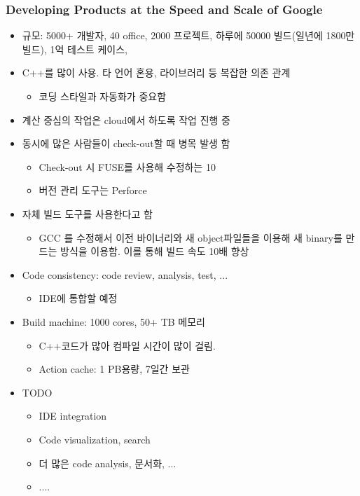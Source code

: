 \begin{frame}
\frametitle{Developing Products at the Speed and Scale of Google}

\begin{itemize}

\item 규모: 5000+ 개발자, 40 office, 2000 프로젝트, 하루에 50000 빌드(일년에 1800만 빌드), 1억  테스트 케이스,  

\item C++를 많이 사용. 타 언어 혼용, 라이브러리 등 복잡한 의존 관계
    \begin{itemize}
    \item 코딩 스타일과 자동화가 중요함
    \end{itemize}

\item 계산 중심의 작업은 cloud에서 하도록 작업 진행 중

\item 동시에 많은 사람들이 check-out할 때 병목 발생 함
    \begin{itemize}
    \item Check-out 시 FUSE를 사용해 수정하는 10%
    \item 버전 관리 도구는 Perforce
    \end{itemize}

\item 자체 빌드 도구를 사용한다고 함
    \begin{itemize}
    \item GCC 를 수정해서  이전 바이너리와 새 object파일들을 이용해 새 binary를 만드는 방식을 이용함. 이를 통해 빌드 속도 10배 향상
    \end{itemize}

\item Code consistency: code review, analysis, test, ...
    \begin{itemize}
    \item IDE에 통합할 예정
    \end{itemize}

\item Build machine: 1000 cores, 50+ TB 메모리
    \begin{itemize}
    \item C++코드가 많아 컴파일 시간이 많이 걸림.
    \item Action cache: 1 PB용량, 7일간 보관
    \end{itemize}

\item TODO
    \begin{itemize}
    \item IDE integration 
    \item Code  visualization, search
    \item 더 많은 code analysis, 문서화, ...
    \item .... 
    \end{itemize}
\end{itemize}

\end{frame}

